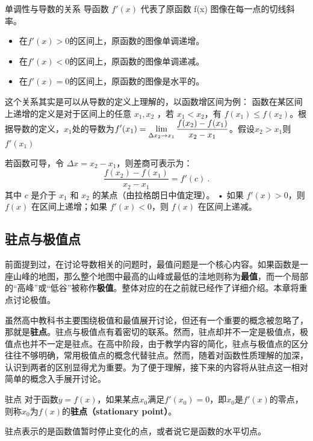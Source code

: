 \begin{theorem}{单调性与导数的关系}
导函数  $f'(x)$  代表了原函数  f(x)  图像在每一点的切线斜率。
\begin{itemize}
\item 在$f'(x)>0$的区间上，原函数的图像单调递增。
\item 在$f'(x)<0$的区间上，原函数的图像单调递减。
\item 在$f'(x)=0$的区间上，原函数的图像是水平的。
\end{itemize}
\end{theorem}

这个关系其实是可以从导数的定义上理解的，以函数增区间为例：
函数在某区间上递增的定义是对于区间上的任意 $x_1, x_2$ ，若 $x_1 < x_2$，有 $f(x_1) \leq f(x_2)$。根据导数的定义，$x_1$处的导数为$\displaystyle f'(x_1)=\lim_{\Delta x_2\to x_1}{f(x_2)-f(x_1)\over x_2-x_1}$。假设$x_2>x_1$则$f'(x_1)$

若函数可导，令 $\Delta x = x_2 - x_1$，则差商可表示为：
$$\frac{f(x_2) - f(x_1)}{x_2 - x_1} = f'(c)~.$$
其中 $c$ 是介于 $x_1$ 和 $x_2$ 的某点（由拉格朗日中值定理）。
	•	如果 $f'(x) > 0$，则 $f(x)$ 在区间上递增；如果 $f'(x) < 0$，则 $f(x)$ 在区间上递减。

\subsection{驻点与极值点}

前面提到过，在讨论导数相关的问题时，最值问题是一个核心内容。如果函数是一座山峰的地图，那么整个地图中最高的山峰或最低的洼地则称为\textbf{最值}，而一个局部的“高峰”或“低谷”被称作\textbf{极值}。整体对应的在之前就已经作了详细介绍。本章将重点讨论极值。

虽然高中教科书主要围绕极值和最值展开讨论，但还有一个重要的概念被忽略了，那就是\textbf{驻点}。驻点与极值点有着密切的联系。然而，驻点却并不一定是极值点，极值点也并不一定是驻点。在高中阶段，由于教学内容的简化，驻点与极值点的区分往往不够明确，常用极值点的概念代替驻点。然而，随着对函数性质理解的加深，认识到两者的区别显得尤为重要。为了便于理解，接下来的内容将从驻点这一相对简单的概念入手展开讨论。

\begin{definition}{驻点}
对于函数$y=f(x)$，如果某点$x_0$满足$f'(x_0)=0$，即$x_0$是$f'(x)$的零点，则称$x_0$为$f(x)$的\textbf{驻点（stationary point）}。
\end{definition}

驻点表示的是函数值暂时停止变化的点，或者说它是函数的水平切点。

